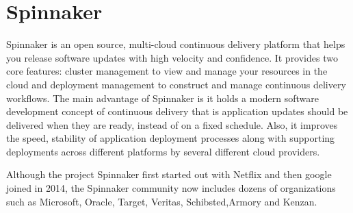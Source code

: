 \section{Spinnaker}


Spinnaker is an open source, multi-cloud continuous delivery platform that helps
you release software updates with high velocity and confidence. 
It provides two core features: cluster management to view and manage your 
resources in the cloud and deployment management to construct and manage continuous delivery workflows. \cite{hid-sp18-602-spinnaker-io} 
The main advantage of Spinnaker is it holds a modern software development 
concept of continuous delivery that is application updates should be delivered when they are ready, instead of on a fixed schedule. 
Also, it improves the speed, stability of application deployment processes along
with supporting deployments across different platforms by several different 
cloud providers. 

Although the project Spinnaker first started out with Netflix and 
then google joined in 2014, the Spinnaker community now includes dozens of 
organizations such as Microsoft, Oracle, Target, Veritas, Schibsted,Armory 
and Kenzan. \cite{hid-sp18-602-spinnaker-gc} 

